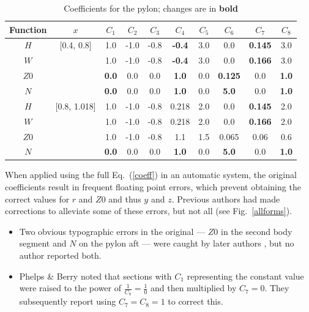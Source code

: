 \documentclass[12pt]{article}
\begin{document}
\begin{table}[!h]
\caption{Coefficients for the pylon; changes are in \textbf{bold}}
\centering
\begin{tabular}{cccccccccc}
Function & $x$ & $C_{1}$ & $C_{2}$ & $C_{3}$ & $C_{4}$ & $C_{5}$ & $C_{6}$ & $C_{7}$ & $C_{8}$ \\
\hline
$H$          & [0.4, 0.8]  & 1.0             & -1.0 & -0.8 & \textbf{-0.4} & 3.0 & 0.0                  & \textbf{0.145} & 3.0 \\
$W$          &                 & 1.0             & -1.0 & -0.8 & \textbf{-0.4} & 3.0 & 0.0                  & \textbf{0.166} & 3.0 \\
$Z0$ &                 & \textbf{0.0} & 0.0  & 0.0  & \textbf{1.0}  & 0.0  & \textbf{0.125} & 0.0                 & \textbf{1.0} \\
$N$           &                 & \textbf{0.0} & 0.0  & 0.0  & \textbf{1.0}  & 0.0  & \textbf{5.0}     & 0.0                 & \textbf{1.0} \\
\hline
$H$          & [0.8, 1.018]  & 1.0             & -1.0 & -0.8 & 0.218         & 2.0 & 0.0                 & \textbf{0.145} & 2.0 \\
$W$          &                     & 1.0             & -1.0 & -0.8 & 0.218         & 2.0 & 0.0                 & \textbf{0.166} & 2.0 \\
$Z0$ &                     & 1.0             & -1.0 & -0.8 & 1.1             & 1.5 & 0.065             & 0.06               & 0.6 \\
$N$           &                     & \textbf{0.0} & 0.0  & 0.0  & \textbf{1.0} & 0.0 & \textbf{5.0}     & 0.0                 & \textbf{1.0} \\
\end{tabular}
\label{pycoeff}
\end{table}

When applied using the full Eq.~(\ref{coeff}) in an automatic system, the original coefficients result in
frequent floating point errors, which prevent obtaining the correct values for $r$ and $Z0$ and thus $y$ and $z$.
Previous authors had made corrections to alleviate some of these errors, but not all (see Fig.~\ref{allforms}).
\begin{itemize}
\item Two obvious typographic errors in the original \cite{nasa80051} --- $Z0$ in the second body segment and $N$
on the pylon aft --- were caught by later authors \cite{nasa87762,mineckgorton}, but no author reported both.
\item Phelps \& Berry \cite{nasa87762} noted that sections with $C_1$ representing the constant value were raised
to the power of $\frac{1}{C_8} = \frac{1}{0}$ and then multiplied by $C_7 = 0$. They subsequently report using
$C_7 = C_8 = 1$ to correct this.
\end{itemize}
\end{document}
